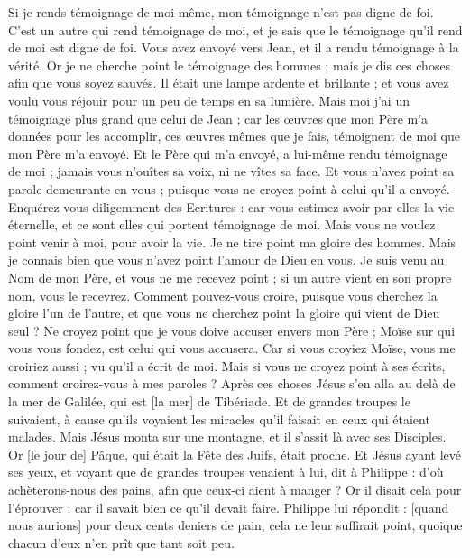 \begin{multicols}{2}
Si je rends témoignage de moi-même, mon témoignage n'est pas digne de foi.
C'est un autre qui rend témoignage de moi, et je sais que le témoignage qu'il rend de moi est digne de foi.
Vous avez envoyé vers Jean, et il a rendu témoignage à la vérité.
Or je ne cherche point le témoignage des hommes ; mais je dis ces choses afin que vous soyez sauvés.
Il était une lampe ardente et brillante ; et vous avez voulu vous réjouir pour un peu de temps en sa lumière.
Mais moi j'ai un témoignage plus grand que celui de Jean ; car les œuvres que mon Père m'a données pour les accomplir, ces œuvres mêmes que je fais, témoignent de moi que mon Père m'a envoyé.
Et le Père qui m'a envoyé, a lui-même rendu témoignage de moi ; jamais vous n'ouîtes sa voix, ni ne vîtes sa face.
Et vous n'avez point sa parole demeurante en vous ; puisque vous ne croyez point à celui qu'il a envoyé.
Enquérez-vous diligemment des Ecritures : car vous estimez avoir par elles la vie éternelle, et ce sont elles qui portent témoignage de moi.
Mais vous ne voulez point venir à moi, pour avoir la vie.
Je ne tire point ma gloire des hommes.
Mais je connais bien que vous n'avez point l'amour de Dieu en vous.
Je suis venu au Nom de mon Père, et vous ne me recevez point ; si un autre vient en son propre nom, vous le recevrez.
Comment pouvez-vous croire, puisque vous cherchez la gloire l'un de l'autre, et que vous ne cherchez point la gloire qui vient de Dieu seul ?
Ne croyez point que je vous doive accuser envers mon Père ; Moïse sur qui vous vous fondez, est celui qui vous accusera.
Car si vous croyiez Moïse, vous me croiriez aussi ; vu qu'il a écrit de moi.
Mais si vous ne croyez point à ses écrits, comment croirez-vous à mes paroles ?
\VerseOne{}Après ces choses Jésus s'en alla au delà de la mer de Galilée, qui est [la mer] de Tibériade.
Et de grandes troupes le suivaient, à cause qu'ils voyaient les miracles qu'il faisait en ceux qui étaient malades.
Mais Jésus monta sur une montagne, et il s'assit là avec ses Disciples.
Or [le jour de] Pâque, qui était la Fête des Juifs, était proche.
Et Jésus ayant levé ses yeux, et voyant que de grandes troupes venaient à lui, dit à Philippe : d'où achèterons-nous des pains, afin que ceux-ci aient à manger ?
Or il disait cela pour l'éprouver : car il savait bien ce qu'il devait faire.
Philippe lui répondit : [quand nous aurions] pour deux cents deniers de pain, cela ne leur suffirait point, quoique chacun d'eux n'en prît que tant soit peu.

\end{multicols}
